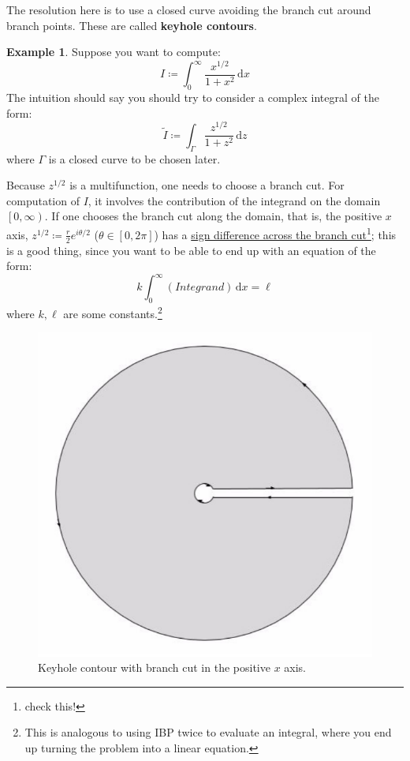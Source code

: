 \documentclass[a4paper, 12pt]{article}
\theoremstyle{definition}
\newtheorem{example}{Example}
\numberwithin{theorem}{section}
\numberwithin{definition}{section}
\numberwithin{exercise}{section}
\numberwithin{remark}{section}
\numberwithin{figure}{section}
\numberwithin{example}{section}
\newcommand{\intd}{\,\text{d}}
\begin{document}
The resolution here is to use a closed curve avoiding the branch cut around branch points.
These are called \textbf{keyhole contours}.

\begin{example}
    Suppose you want to compute:
    \begin{equation*}
        I \coloneqq \int_{0}^{\infty} \frac{x^{1/2}}{1+x^2} \intd x
    \end{equation*}
    The intuition should say you should try to consider a complex integral of the form:
    \begin{equation*}
        \tilde I \coloneqq \int_{\Gamma} \frac{z^{1/2}}{1+z^2} \intd z
    \end{equation*}
    where $\Gamma$ is a closed curve to be chosen later.

    Because $z^{1/2}$ is a multifunction, one needs to choose a branch cut.
    For computation of $I$, it involves the contribution of the integrand
    on the domain $\left[ 0, \infty \right)$.
    If one chooses the branch cut along the domain, that is, the positive $x$ axis,
    $z^{1/2} \coloneqq \frac{r}{2} e^{i \theta/2}$ ($\theta \in \left[ 0, 2\pi \right]$) has a \ul{sign difference across the branch cut}\footnote{check this!};
    this is a good thing, since you want to be able to end up with an equation of the form:
    \begin{equation*}
        k \int_{0}^{\infty} \left( Integrand \right) \intd x = \ell
    \end{equation*}
    where $k, \ell$ are some constants.\footnote{This is analogous to using IBP twice to evaluate an integral, where you end up turning the problem into a linear equation.}

    \begin{figure}[tbp]
        \centering
        \includegraphics[scale=0.5]{Keyhole}
        \caption{Keyhole contour with branch cut in the positive $x$ axis.}
        \label{fig: Keyhole 1}
    \end{figure}


\end{example}
\end{document}
